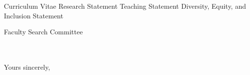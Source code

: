 



\addAttach%
{Curriculum Vitae}%
{Research Statement}%
{Teaching Statement}%
{Diversity, Equity, and Inclusion Statement}

\def\appJobID{%
    \ifthenelse{\equal{\jobID}{}}{\unskip}{\unskip\textemdash Job \# \jobID{}}%
}
\def\toAddr{%
Faculty Search Committee \\ \appDept{} \\ \appSchool{} \\ \appAddr{}%
}

\begin{letter}{\toAddr{}}
    \opening{\myOpening{}}
    
    \collabCustom{}%
    
    \closing{Yours sincerely,}
    \encl{\listAttach{}}
\end{letter}
